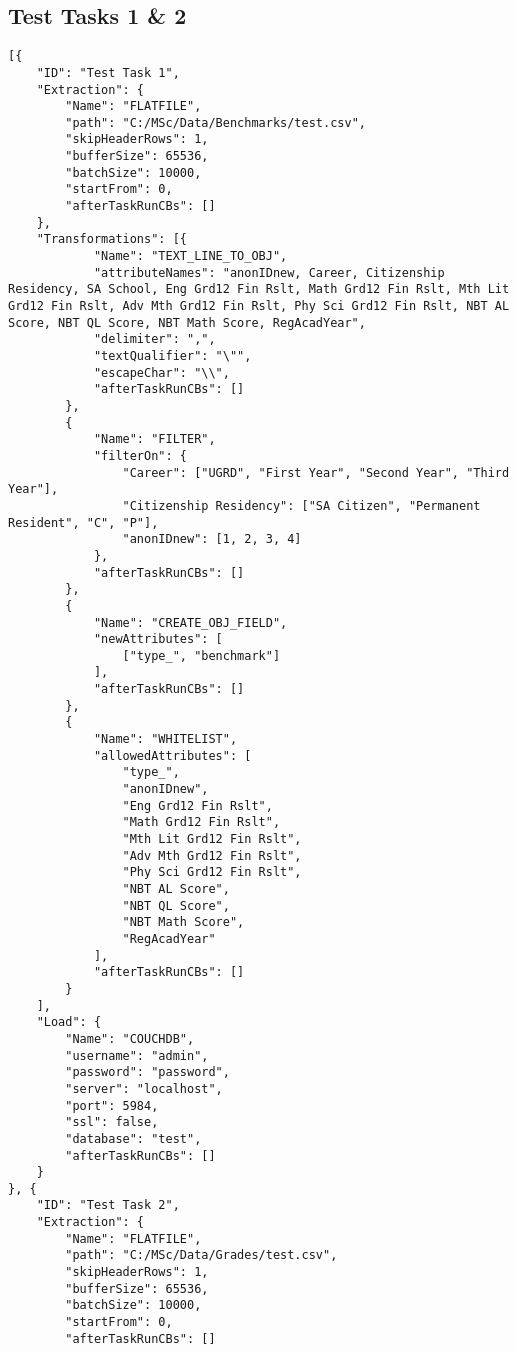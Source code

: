 \subsection{Test Tasks 1 \& 2}
\label{netl-tasks-test-1}
\begin{verbatim}
[{
    "ID": "Test Task 1",
    "Extraction": {
        "Name": "FLATFILE",
        "path": "C:/MSc/Data/Benchmarks/test.csv",
        "skipHeaderRows": 1,
        "bufferSize": 65536,
        "batchSize": 10000,
        "startFrom": 0,
        "afterTaskRunCBs": []
    },
    "Transformations": [{
            "Name": "TEXT_LINE_TO_OBJ",
            "attributeNames": "anonIDnew, Career, Citizenship Residency, SA School, Eng Grd12 Fin Rslt, Math Grd12 Fin Rslt, Mth Lit Grd12 Fin Rslt, Adv Mth Grd12 Fin Rslt, Phy Sci Grd12 Fin Rslt, NBT AL Score, NBT QL Score, NBT Math Score, RegAcadYear",
            "delimiter": ",",
            "textQualifier": "\"",
            "escapeChar": "\\",
            "afterTaskRunCBs": []
        },
        {
            "Name": "FILTER",
            "filterOn": {
                "Career": ["UGRD", "First Year", "Second Year", "Third Year"],
                "Citizenship Residency": ["SA Citizen", "Permanent Resident", "C", "P"],
                "anonIDnew": [1, 2, 3, 4]
            },
            "afterTaskRunCBs": []
        },
        {
            "Name": "CREATE_OBJ_FIELD",
            "newAttributes": [
                ["type_", "benchmark"]
            ],
            "afterTaskRunCBs": []
        },
        {
            "Name": "WHITELIST",
            "allowedAttributes": [
                "type_",
                "anonIDnew",
                "Eng Grd12 Fin Rslt",
                "Math Grd12 Fin Rslt",
                "Mth Lit Grd12 Fin Rslt",
                "Adv Mth Grd12 Fin Rslt",
                "Phy Sci Grd12 Fin Rslt",
                "NBT AL Score",
                "NBT QL Score",
                "NBT Math Score",
                "RegAcadYear"
            ],
            "afterTaskRunCBs": []
        }
    ],
    "Load": {
        "Name": "COUCHDB",
        "username": "admin",
        "password": "password",
        "server": "localhost",
        "port": 5984,
        "ssl": false,
        "database": "test",
        "afterTaskRunCBs": []
    }
}, {
    "ID": "Test Task 2",
    "Extraction": {
        "Name": "FLATFILE",
        "path": "C:/MSc/Data/Grades/test.csv",
        "skipHeaderRows": 1,
        "bufferSize": 65536,
        "batchSize": 10000,
        "startFrom": 0,
        "afterTaskRunCBs": []

\end{verbatim}
